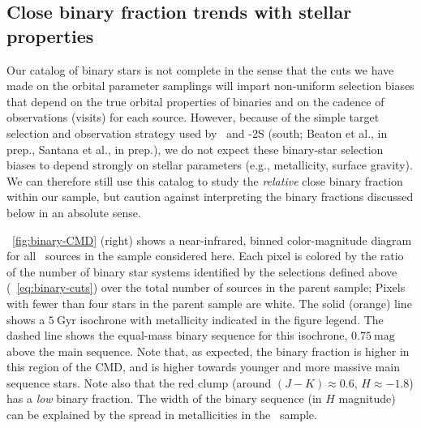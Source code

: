 \documentclass[modern]{aastex63}
\begin{document}
\subsection{Close binary fraction trends with stellar properties}
\label{sec:binary-fraction}

Our catalog of binary stars is not complete in the sense that the cuts we have
made on the orbital parameter samplings will impart non-uniform selection biases
that depend on the true orbital properties of binaries and on the cadence of
observations (visits) for each source.
However, because of the simple target selection and observation strategy used by
\apogee\, \citep{Zasowski:2013, Zasowski:2017} and \apogee-2S (south; Beaton et
al., in prep., Santana et al., in prep.), we do not expect these binary-star
selection biases to depend strongly on stellar parameters (e.g., metallicity,
surface gravity).
We can therefore still use this catalog to study the \emph{relative} close
binary fraction within our sample, but caution against interpreting the binary
fractions discussed below in an absolute sense.

\figurename~\ref{fig:binary-CMD} (right) shows a near-infrared, binned
color-magnitude diagram for all \apogee\ sources in the sample considered here.
Each pixel is colored by the ratio of the number of binary star systems
identified by the selections defined above (\equationname~\ref{eq:binary-cuts})
over the total number of sources in the parent sample; Pixels with fewer than
four stars in the parent sample are white.
The solid (orange) line shows a $5~\mathrm{Gyr}$  isochrone
\cite{Dotter:2016, Choi:2016, Paxton:2011, Paxton:2013, Paxton:2015} with
metallicity indicated in the figure legend.
The dashed line shows the equal-mass binary sequence for this isochrone,
$0.75~\mathrm{mag}$ above the main sequence.
Note that, as expected, the binary fraction is higher in this region of the CMD,
and is higher towards younger and more massive main sequence stars.
Note also that the red clump (around $(J-K) \approx 0.6$, $H \approx -1.8$) has
a \emph{low} binary fraction.
The width of the binary sequence (in $H$ magnitude) can be explained by the
spread in metallicities in the \apogee\ sample.
\end{document}
